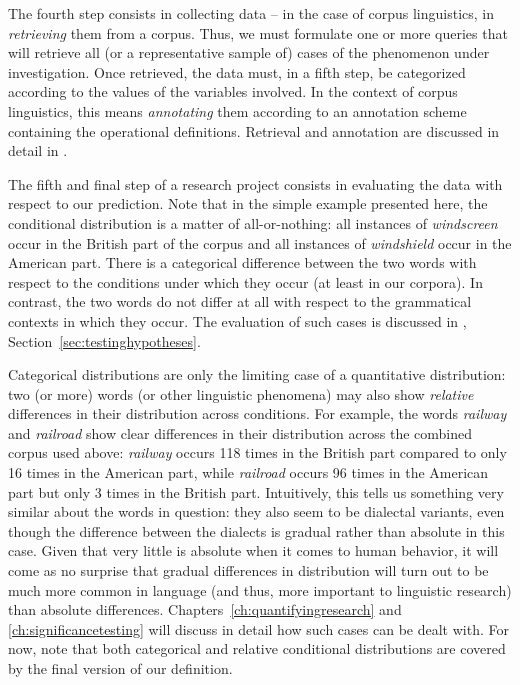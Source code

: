 The fourth step consists in collecting data -- in the case of corpus linguistics, in \emph{retrieving}  them from a corpus. Thus, we must formulate one or more queries  that will retrieve all (or a representative  sample  of) cases of the phenomenon under investigation. Once retrieved, the data must, in a fifth step, be categorized  according to the values of the variables involved. In the context of corpus linguistics, this means \emph{annotating}  them according to an annotation  scheme containing the operational  definitions. Retrieval and annotation  are discussed in detail in .

The fifth and final step of a research project consists in evaluating the data with respect to our prediction. Note that in the simple example presented here, the conditional distribution  is a matter of all\hyp{}or\hyp{}nothing: all instances of \textit{windscreen} occur in the British  part of the corpus and all instances of \textit{windshield} occur in the American  part. There is a categorical difference between the two words with respect to the conditions under which they occur (at least in our corpora). In contrast, the two words do not differ at all with respect to the grammatical contexts in which they occur. The evaluation of such cases is discussed in , Section~\ref{sec:testinghypotheses}.

Categorical distributions are only the limiting case of a quantitative  distribution: two (or more) words (or other linguistic phenomena) may also show \emph{relative} differences in their distribution  across conditions. For example, the words \textit{railway} and \textit{railroad} show clear differences in their distribution across the combined corpus used above: \textit{railway} occurs 118 times in the British  part compared to only 16 times in the American  part, while \textit{railroad} occurs 96 times in the American part but only 3 times in the British part. Intuitively, this tells us something very similar about the words in question: they also seem to be dialectal variants, even though the difference between the dialects is gradual rather than absolute in this case. Given that very little is absolute when it comes to human behavior, it will come as no surprise that gradual differences in distribution  will turn out to be much more common in language (and thus, more important to linguistic research) than absolute differences. Chapters~\ref{ch:quantifyingresearch} and \ref{ch:significancetesting} will discuss in detail how such cases can be dealt with. For now, note that both categorical and relative conditional distributions  are covered by the final version of our definition.

